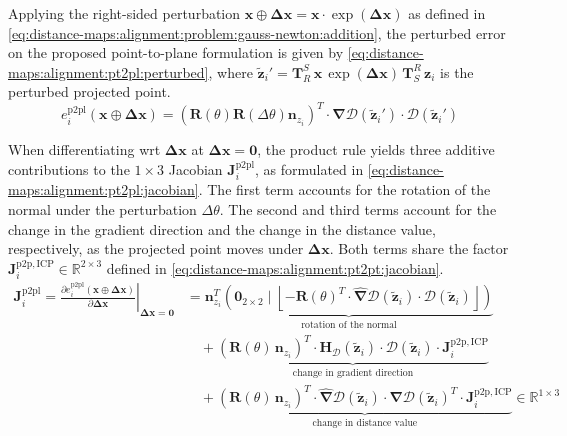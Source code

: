 Applying the right-sided perturbation
$\mathbf{x} \oplus \mathbf{\Delta x} = \mathbf{x} \cdot \exp(\mathbf{\Delta x})$
as defined in \eqref{eq:distance-maps:alignment:problem:gauss-newton:addition},
the perturbed error on the proposed point-to-plane formulation is given by
\eqref{eq:distance-maps:alignment:pt2pl:perturbed},
where $\tilde{\mathbf{z}}_i' =
\mathbf{T}_R^S\,\mathbf{x}\,\exp(\mathbf{\Delta x})\,\mathbf{T}_S^R\,\mathbf{z}_i$
is the perturbed projected point.
\begin{equation}
\label{eq:distance-maps:alignment:pt2pl:perturbed}
e_i^{\mathrm{p2pl}}\!\left(\mathbf{x} \oplus \mathbf{\Delta x}\right) =
\left(\mathbf{R}(\theta) \mathbf{R}(\Delta\theta)
\mathbf{n}_{z_i}\right)^T \cdot
\hat{\bm{\nabla}}\mathcal{D}\!\left(\tilde{\mathbf{z}}_i'\right) \cdot
\mathcal{D}\!\left(\tilde{\mathbf{z}}_i'\right)
\end{equation}

When differentiating \gls{wrt} $\mathbf{\Delta x}$ at
$\mathbf{\Delta x} = \mathbf{0}$,
the product rule yields three additive contributions to the $1 \times 3$
Jacobian $\mathbf{J}_i^{\mathrm{p2pl}}$, as formulated in
\eqref{eq:distance-maps:alignment:pt2pl:jacobian}.
The first term accounts for the rotation of the normal under the perturbation
$\Delta\theta$.
The second and third terms account for the change in the gradient direction and
the change in the distance value, respectively, as the projected point moves
under $\mathbf{\Delta x}$. Both terms share the factor
$\mathbf{J}_i^{\mathrm{p2p,ICP}} \in \mathbb{R}^{2\times3}$ defined in
\eqref{eq:distance-maps:alignment:pt2pt:jacobian}.
\begin{equation}
\begin{aligned}
\label{eq:distance-maps:alignment:pt2pl:jacobian}
\mathbf{J}_i^{\mathrm{p2pl}} =
\left.\frac{\partial e_i^{\mathrm{p2pl}}\!\left(\mathbf{x} \oplus \mathbf{\Delta x}\right)}
           {\partial \mathbf{\Delta x}}\right|_{\mathbf{\Delta x}=\mathbf{0}}
& =
\underbrace{
  \mathbf{n}_{z_i}^{T}
  \left(\mathbf{0}_{2\times2} \mid
    \left\lfloor -\mathbf{R}(\theta)^T \cdot
      \hat{\bm{\nabla}}\mathcal{D}\!\left(\tilde{\mathbf{z}}_i\right) \cdot
      \mathcal{D}\!\left(\tilde{\mathbf{z}}_i\right)
    \right\rfloor
  \right)
}_{\text{rotation of the normal}}
\\
&\quad+
\underbrace{
  \left(\mathbf{R}(\theta)\,\mathbf{n}_{z_i}\right)^T \cdot
  \mathbf{H}_{\mathcal{D}}\!\left(\tilde{\mathbf{z}}_i\right) \cdot
  \mathcal{D}\!\left(\tilde{\mathbf{z}}_i\right) \cdot
  \mathbf{J}_i^{\mathrm{p2p,ICP}}
}_{\text{change in gradient direction}}
\\
&\quad+
\underbrace{
  \left(\mathbf{R}(\theta)\,\mathbf{n}_{z_i}\right)^T \cdot
  \hat{\bm{\nabla}}\mathcal{D}\!\left(\tilde{\mathbf{z}}_i\right) \cdot
  \bm{\nabla}\mathcal{D}\!\left(\tilde{\mathbf{z}}_i\right)^T \cdot
  \mathbf{J}_i^{\mathrm{p2p,ICP}}
}_{\text{change in distance value}}
\in \mathbb{R}^{1\times3}
\end{aligned}
\end{equation}

